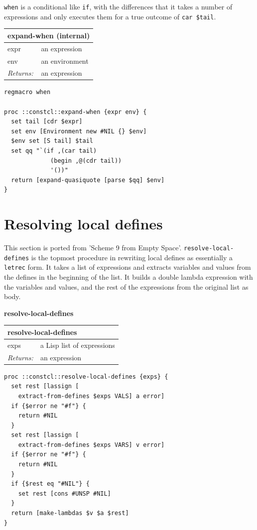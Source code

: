 \documentclass[twoside,9pt]{report}
\begin{document}
\texttt{when} is a conditional like \texttt{if}, with the differences that it takes a number of expressions and only executes them for a true outcome of \texttt{car \$tail}.

\begin{tabular}{ |l l| }
\hline
\multicolumn{2}{|l|}{expand-when (internal)} \\
\hline
expr & an expression \\
env & an environment \\
\textit{Returns:} & an expression \\
\hline
\end{tabular}

\noindent\makebox[\linewidth]{\rule{\linewidth}{0.4pt}}
\begin{lstlisting}
regmacro when
 
proc ::constcl::expand-when {expr env} {
  set tail [cdr $expr]
  set env [Environment new #NIL {} $env]
  $env set [S tail] $tail
  set qq "`(if ,(car tail)
             (begin ,@(cdr tail))
             '())"
  return [expand-quasiquote [parse $qq] $env]
}
\end{lstlisting}
\noindent\makebox[\linewidth]{\rule{\linewidth}{0.4pt}}
\section{Resolving local defines}
\label{resolving-local-defines}

This section is ported from 'Scheme 9 from Empty Space'. \texttt{resolve-local-defines} is the topmost procedure in rewriting local defines as essentially a \texttt{letrec} form. It takes a list of expressions and extracts variables and values from the defines in the beginning of the list. It builds a double lambda expression with the variables and values, and the rest of the expressions from the original list as body.


\textbf{resolve-local-defines}

\begin{tabular}{ |l l| }
\hline
\multicolumn{2}{|l|}{resolve-local-defines} \\
\hline
exps & a Lisp list of expressions \\
\textit{Returns:} & an expression \\
\hline
\end{tabular}

\noindent\makebox[\linewidth]{\rule{\linewidth}{0.4pt}}
\begin{lstlisting}
proc ::constcl::resolve-local-defines {exps} {
  set rest [lassign [
    extract-from-defines $exps VALS] a error]
  if {$error ne "#f"} {
    return #NIL
  }
  set rest [lassign [
    extract-from-defines $exps VARS] v error]
  if {$error ne "#f"} {
    return #NIL
  }
  if {$rest eq "#NIL"} {
    set rest [cons #UNSP #NIL]
  }
  return [make-lambdas $v $a $rest]
}
\end{lstlisting}
\noindent\makebox[\linewidth]{\rule{\linewidth}{0.4pt}}
\end{document}
